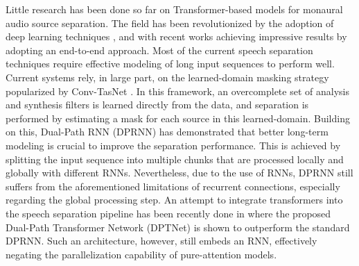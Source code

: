 \documentclass{article}
\begin{document}
Little research has been done so far on Transformer-based models for monaural audio source separation. The field has been revolutionized by the adoption of deep learning techniques \cite{hershey2015deep,  yu2017permutation, kolbaek2017multitalker, venkataramani2017endtoend, luo2018convtasnet, Huang2014}, and with recent works \cite{luo2020dualpath, liu2019divide, shi2019furcanext, nachmani2020voice, tzinis2020sudo, dptn, zeghidour2020wavesplit} achieving impressive results by adopting an end-to-end approach. Most of the current speech separation techniques \cite{venkataramani2017endtoend, luo2018convtasnet, liu2019divide, luo2020dualpath, shi2019furcanext, nachmani2020voice, tzinis2020sudo,  dptn} require effective modeling of long input sequences to perform well.
Current systems rely, in large part, on the learned-domain masking strategy popularized by Conv-TasNet \cite{luo2018convtasnet}. In this framework, an overcomplete set of analysis and synthesis filters is learned directly from the data, and separation is performed by estimating a mask for each source in this learned-domain.
Building on this, Dual-Path RNN (DPRNN) \cite{luo2020dualpath} has demonstrated that better long-term modeling is crucial to improve the separation performance. This is achieved by splitting the input sequence into multiple chunks that are processed locally and globally with different RNNs. Nevertheless, due to the use of RNNs, DPRNN still suffers from the aforementioned limitations of recurrent connections, especially regarding the global processing step. 
An attempt to integrate transformers into the speech separation pipeline has been recently done in \cite{dptn} where the proposed Dual-Path Transformer Network (DPTNet) is shown to outperform the standard DPRNN. Such an architecture, however, still embeds an RNN, effectively negating the parallelization capability of pure-attention models. 

\newcommand{\mixture}{x}
\newcommand{\ldim}{F}
\newcommand{\llen}{T'}
\newcommand{\nspk}{Ns}
\newcommand{\nsepf}{M}
\newcommand{\chnksize}{C}
\newcommand{\hopsize}{H}
\newcommand{\numchnks}{Nc}
\newcommand{\numintra}{Nintra}
\newcommand{\numinter}{Ninter}
\end{document}
